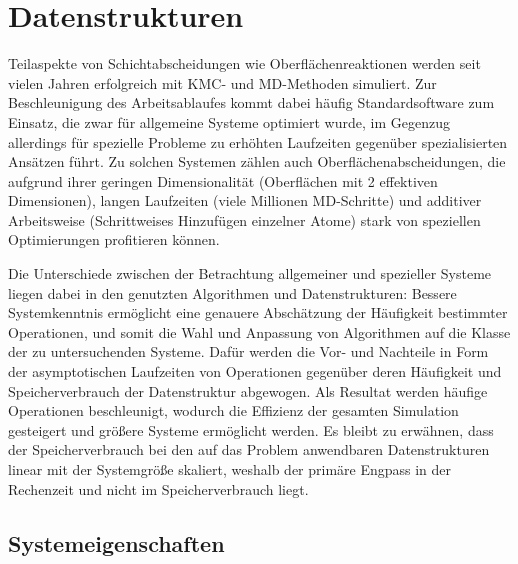 \section{Datenstrukturen}
\label{datastructures}


Teilaspekte von Schichtabscheidungen wie Oberflächenreaktionen werden seit vielen Jahren erfolgreich mit KMC- und MD-Methoden simuliert.
Zur Beschleunigung des Arbeitsablaufes kommt dabei häufig Standardsoftware zum Einsatz, die zwar für allgemeine Systeme optimiert wurde,
im Gegenzug allerdings für spezielle Probleme zu erhöhten Laufzeiten gegenüber spezialisierten Ansätzen führt.
Zu solchen Systemen zählen auch Oberflächenabscheidungen, die aufgrund ihrer geringen Dimensionalität (Oberflächen mit 2 effektiven Dimensionen), langen Laufzeiten (viele Millionen MD-Schritte) und additiver Arbeitsweise (Schrittweises Hinzufügen einzelner Atome) stark von speziellen Optimierungen profitieren können.


Die Unterschiede zwischen der Betrachtung allgemeiner und spezieller Systeme liegen dabei in den genutzten Algorithmen und Datenstrukturen:
Bessere Systemkenntnis ermöglicht eine genauere Abschätzung der Häufigkeit bestimmter Operationen, und somit die Wahl und Anpassung von Algorithmen auf die Klasse der zu untersuchenden Systeme.
Dafür werden die Vor- und Nachteile in Form der asymptotischen Laufzeiten von Operationen gegenüber deren Häufigkeit und Speicherverbrauch der Datenstruktur abgewogen.
Als Resultat werden häufige Operationen beschleunigt, wodurch die Effizienz der gesamten Simulation gesteigert und größere Systeme ermöglicht werden.
Es bleibt zu erwähnen, dass der Speicherverbrauch bei den auf das Problem anwendbaren Datenstrukturen linear mit der Systemgröße skaliert, weshalb der primäre Engpass in der Rechenzeit und nicht im Speicherverbrauch liegt.

\subsection{Systemeigenschaften}

